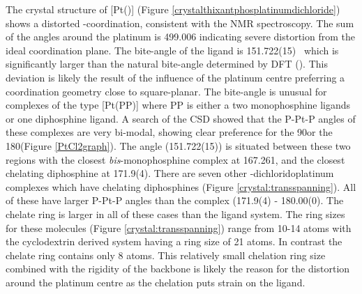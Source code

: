 The crystal structure of [Pt(\tButhixantphos)] (Figure \ref{crystalthixantphosplatinumdichloride}) shows a distorted \trans-coordination, consistent with the NMR spectroscopy.  The sum of the angles around the platinum is 499.006\degrees{} indicating severe distortion from the ideal coordination plane. The bite-angle of the ligand is 151.722(15)~\degrees{} which is significantly larger than the natural bite-angle determined by DFT (\fixme{126.98\degrees{}}).  This deviation is likely the result of the influence of the platinum centre preferring a coordination geometry close to square-planar.  The bite-angle is unusual for complexes of the type [Pt(PP)] where PP is either a two monophosphine ligands or one diphosphine ligand.  A search of the \gls{CSD}  showed that the P-Pt-P angles of these complexes are very bi-modal, showing clear preference for the \cis{} 90\degrees or the \trans{} 180\degrees (Figure \ref{PtCl2graph}).  The \tButhixantphos{} angle (151.722(15)\degrees) is situated between these two regions with the closest \emph{bis}-monophosphine complex at 167.261, and the closest chelating diphosphine at 171.9(4)\degrees{}.  There are seven other \trans{}-dichloridoplatinum complexes which have chelating diphosphines (Figure \ref{crystal:transspanning}).\cite{Bachechi1992, Engeldinger2003, Newman2012, Owens2008, Beuken1997, Freixa2003b, Ruhland2007}  All of these have larger P-Pt-P angles than the \tButhixantphos{} complex (171.9(4) - 180.00(0)\degrees{}.  The chelate ring is larger in all of these cases than the \tButhixantphos{} ligand system.  The ring sizes for these molecules (Figure \ref{crystal:transspanning}) range from 10-14 atoms with the cyclodextrin derived system having a ring size of 21 atoms.  In contrast the \tButhixantphos{} chelate ring contains only 8 atoms.  This relatively small chelation ring size combined with the rigidity of the backbone is likely the reason for the distortion around the platinum centre as the \trans{} chelation puts strain on the \tButhixantphos{} ligand.  

